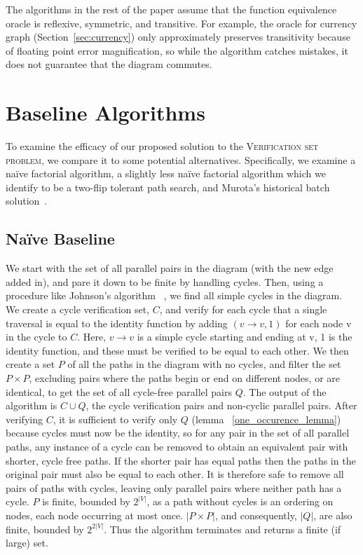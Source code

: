 \documentclass[sigplan,review,anonymous]{acmart}
\begin{document}
The algorithms in the rest of the paper assume that the function equivalence oracle is reflexive, symmetric, and transitive.
For example, the oracle for currency graph (Section~\ref{sec:currency}) only approximately preserves transitivity because of floating point error magnification, so while the algorithm catches mistakes, it does not guarantee that the diagram commutes.

\section{Baseline Algorithms}

To examine the efficacy of our proposed solution to the \textsc{Verification set problem}, we compare it to some potential alternatives.
Specifically, we examine a na\"{i}ve factorial algorithm, a slightly less na\"{i}ve factorial algorithm which we identify to be a two-flip tolerant path search, and Murota's historical batch solution~\cite{commutative}.

\subsection{Na\"{i}ve Baseline}

We start with the set of all parallel pairs in the diagram (with the new edge added in), and pare it down to be finite by handling cycles.
Then, using a procedure like Johnson's algorithm ~\cite{johnson}, we find all simple cycles in the diagram. 
We create a cycle verification set, $C$, and verify for each cycle that a single traversal is equal to the identity function by adding $(v \rightarrow v, 1)$ for each node v in the cycle to $C$.
Here, $v \rightarrow v$ is a simple cycle starting and ending at v, 1 is the identity function, and these must be verified to be equal to each other.
We then create a set $P$ of all the paths in the diagram with no cycles, and filter the set $P \times P$, excluding pairs where the paths begin or end on different nodes, or are identical, to get the set of all cycle-free parallel pairs $Q$.
The output of the algorithm is $C \cup Q$, the cycle verification pairs and non-cyclic parallel pairs.
After verifying $C$, it is sufficient to verify only $Q$ (lemma ~\ref{one_occurence_lemma}) because cycles must now be the identity, so for any pair in the set of all parallel paths, any instance of a cycle can be removed to obtain an equivalent pair with shorter, cycle free paths.
If the shorter pair has equal paths then the paths in the original pair must also be equal to each other.
It is therefore safe to remove all pairs of paths with cycles, leaving only parallel pairs where neither path has a cycle.
$P$ is finite, bounded by $2^{|V|}$, as a path without cycles is an ordering on nodes, each node occurring at most once.
$|P \times P|$, and consequently, $|Q|$, are also finite, bounded by $2^{2|V|}$.
Thus the algorithm terminates and returns a finite (if large) set.
\end{document}
